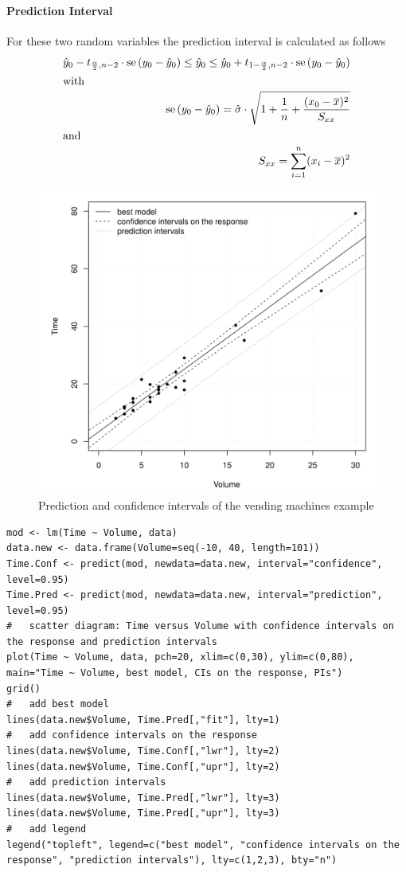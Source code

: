 \documentclass[11pt]{article}
\theoremstyle{definition}
\newcommand*\samplemean[1]{\overline{#1}}
\newcommand*\se[1]{\mathop{\text{se}}\left(#1\right)}
\begin{document}
\paragraph{Prediction Interval} For these two random variables the prediction interval is calculated as follows
\begin{align*}
	\hat{y}_0 - t_{\frac{\alpha}{2}, n-2}\cdot\se{y_0 - \hat{y}_0} \leq \hat{y}_0 \leq \hat{y}_0 + t_{1-\frac{\alpha}{2},n-2}\cdot\se{y_0-\hat{y}_0}\\
	\intertext{with}
	\se{y_0-\hat{y}_0} =\hat{\sigma}\cdot\sqrt{1+\frac{1}{n}+\frac{(x_0 - \samplemean{x})^2}{S_{xx}}}\\
	\intertext{and}
	S_{xx} = \sum_{i=1}^{n}(x_i-\samplemean{x})^2
\end{align*}

\begin{figure}[H]
	\centering
	\includegraphics[width=0.5\linewidth]{img/confidence_interval_response_prediction_interval_vending_machines}
	\caption{Prediction and confidence intervals of the vending machines example}
	\label{fig:confidenceintervalresponsepredictionintervalvendingmachines}
\end{figure}

\begin{verbatim}
mod <- lm(Time ~ Volume, data)
data.new <- data.frame(Volume=seq(-10, 40, length=101))
Time.Conf <- predict(mod, newdata=data.new, interval="confidence", level=0.95)
Time.Pred <- predict(mod, newdata=data.new, interval="prediction", level=0.95)
#   scatter diagram: Time versus Volume with confidence intervals on the response and prediction intervals
plot(Time ~ Volume, data, pch=20, xlim=c(0,30), ylim=c(0,80), main="Time ~ Volume, best model, CIs on the response, PIs")
grid()
#   add best model
lines(data.new$Volume, Time.Pred[,"fit"], lty=1)
#   add confidence intervals on the response
lines(data.new$Volume, Time.Conf[,"lwr"], lty=2)
lines(data.new$Volume, Time.Conf[,"upr"], lty=2)
#   add prediction intervals
lines(data.new$Volume, Time.Pred[,"lwr"], lty=3)
lines(data.new$Volume, Time.Pred[,"upr"], lty=3)
#   add legend
legend("topleft", legend=c("best model", "confidence intervals on the response", "prediction intervals"), lty=c(1,2,3), bty="n")
\end{verbatim}
\end{document}
